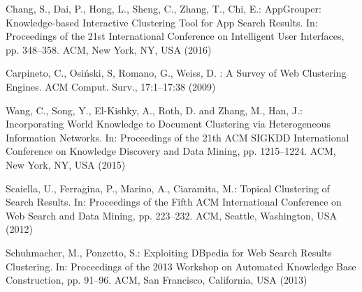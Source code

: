 \documentclass[runningheads]{llncs}
\begin{document}
\begin{thebibliography}{8}
Chang, S., Dai, P., Hong, L., Sheng, C., Zhang, T., Chi, E.: AppGrouper: Knowledge-based Interactive Clustering Tool for App Search Results. In: Proceedings of the 21st International Conference on Intelligent User Interfaces, pp. 348--358. ACM, New York, NY, USA (2016) 

Carpineto, C., Osi\'{n}ski, S, Romano, G., Weiss, D. : A Survey of Web Clustering Engines. ACM Comput. Surv., 17:1--17:38 (2009)

Wang, C., Song, Y., El-Kishky, A., Roth, D. and Zhang, M., Han, J.: Incorporating World Knowledge to Document Clustering via Heterogeneous Information Networks. In: Proceedings of the 21th ACM SIGKDD International Conference on Knowledge Discovery and Data Mining, pp. 1215--1224. ACM, New York, NY, USA (2015)

Scaiella, U., Ferragina, P., Marino, A., Ciaramita, M.: Topical Clustering of Search Results. In: Proceedings of the Fifth ACM International Conference on Web Search and Data Mining, pp. 223--232. ACM, Seattle, Washington, USA (2012) 

Schuhmacher, M., Ponzetto, S.: Exploiting DBpedia for Web Search Results Clustering. In: Proceedings of the 2013 Workshop on Automated Knowledge Base Construction, pp. 91--96. ACM, San Francisco, California, USA (2013) 

\end{thebibliography}

\end{document}
